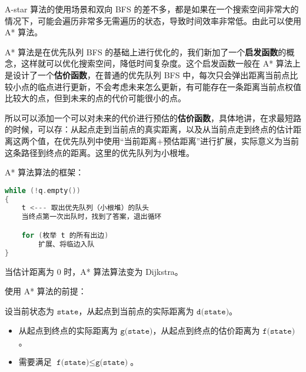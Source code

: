 
A-star 算法的使用场景和双向 BFS 的差不多，都是如果在一个搜索空间非常大的情况下，可能会遍历非常多无需遍历的状态，导致时间效率非常低。由此可以使用 A* 算法。

A* 算法是在优先队列 BFS 的基础上进行优化的，我们新加了一个\textbf{启发函数}的概念，这样就可以优化搜索空间，降低时间复杂度。这个启发函数一般在 A* 算法上是设计了一个\textbf{估价函数}，在普通的优先队列 BFS 中，每次只会弹出距离当前点比较小点的临点进行更新，不会考虑未来怎么更新，有可能存在一条距离当前点权值比较大的点，但到未来的点的代价可能很小的点。

所以可以添加一个可以对未来的代价进行预估的\textbf{估价函数}，具体地讲，在求最短路的时候，可以存：从起点走到当前点的真实距离，以及从当前点走到终点的估计距离这两个值，在优先队列中使用“当前距离+预估距离”进行扩展，实际意义为当前这条路径到终点的距离。这里的优先队列为小根堆。

A* 算法算法的框架：\begin{lstlisting}[language=cpp]
while (!q.empty())
{
    t <--- 取出优先队列（小根堆）的队头
    当终点第一次出队时，找到了答案，退出循环

    for (枚举 t 的所有出边)
        扩展、将临边入队
}
\end{lstlisting}

当估计距离为 $0$ 时，A* 算法算法变为 Dijkstra。

使用 A* 算法的前提：

设当前状态为 $\texttt{state}$，从起点到当前点的实际距离为 $\texttt{d(state)}$。

\begin{itemize}
\item 从起点到终点的实际距离为 $\texttt{g(state)}$，从起点到终点的估价距离为 $\texttt{f(state)}$。
\item 需要满足 $\texttt{f(state)} \leq \texttt{g(state)}$。
\end{itemize}

